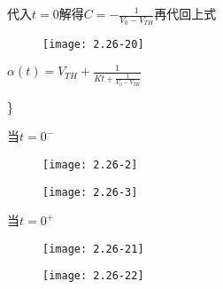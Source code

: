 {	代入$t=0$解得$C=-\frac{1}{V_0-V_{TH}}$再代回上式
	
			\begin{figure}[H] %
		\begin{minipage}{\linewidth}
			\texttt{[image: 2.26-20]}
		\end{minipage}
	\end{figure}
	
	
	
	
	$\alpha (t)=V_{TH}+\frac{1}{Kt+\frac{1}{V_0-V_{TH}}}$
	
	\}
	
	
	
	
	
	
}









\color{black}{
	
}










\scalebox{3}{（b）}


\scalebox{2}{（1）}

当$t=0^-$

\begin{figure}[H] %
	\begin{minipage}{\linewidth}
		\texttt{[image: 2.26-2]}
	\end{minipage}
\end{figure}

\begin{figure}[H] %
	\begin{minipage}{\linewidth}
		\texttt{[image: 2.26-3]}
	\end{minipage}
\end{figure}

\scalebox{2}{（2）}

当$t=0^+$

\begin{figure}[H] %
	\begin{minipage}{\linewidth}
		\texttt{[image: 2.26-21]}
	\end{minipage}
\end{figure}

\begin{figure}[H] %
	\begin{minipage}{\linewidth}
		\texttt{[image: 2.26-22]}
	\end{minipage}
\end{figure}

